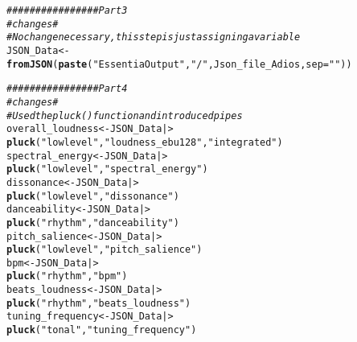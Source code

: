 \documentclass{article}\usepackage[]{graphicx}\usepackage[]{xcolor}
\makeatletter
\newcommand{\hlsng}[1]{\textcolor[rgb]{0.192,0.494,0.8}{#1}}%
\newcommand{\hlcom}[1]{\textcolor[rgb]{0.678,0.584,0.686}{\textit{#1}}}%
\newcommand{\hldef}[1]{\textcolor[rgb]{0.345,0.345,0.345}{#1}}%
\newcommand{\hlkwb}[1]{\textcolor[rgb]{0.69,0.353,0.396}{#1}}%
\newcommand{\hlkwc}[1]{\textcolor[rgb]{0.333,0.667,0.333}{#1}}%
\newcommand{\hlkwd}[1]{\textcolor[rgb]{0.737,0.353,0.396}{\textbf{#1}}}%
\newenvironment{kframe}{%
 \def\at@end@of@kframe{}%
 \ifinner\ifhmode%
  \def\at@end@of@kframe{\end{minipage}}%
  \begin{minipage}{\columnwidth}%
 \fi\fi%
 \def\FrameCommand##1{\hskip\@totalleftmargin \hskip-\fboxsep
 \colorbox{shadecolor}{##1}\hskip-\fboxsep
     \hskip-\linewidth \hskip-\@totalleftmargin \hskip\columnwidth}%
 \MakeFramed {\advance\hsize-\width
   \@totalleftmargin\z@ \linewidth\hsize
   \@setminipage}}%
 {\par\unskip\endMakeFramed%
 \at@end@of@kframe}
\newenvironment{knitrout}{}{} %
\makeatother
\begin{document}
\begin{enumerate}
\begin{knitrout}
\begin{kframe}
\begin{alltt}
\hlcom{################ Part 3}
\hlcom{#changes#}
\hlcom{#No change necessary, this step is just assigning a variable }
\hldef{JSON_Data} \hlkwb{<-} \hlkwd{fromJSON}\hldef{(}\hlkwd{paste}\hldef{(}\hlsng{"EssentiaOutput"}\hldef{,}\hlsng{"/"}\hldef{, Json_file_Adios,} \hlkwc{sep} \hldef{=}\hlsng{""}\hldef{))}

\hlcom{################ Part 4}
\hlcom{#changes#}
\hlcom{#Used the pluck() function and introduced pipes}
\hldef{overall_loudness}  \hlkwb{<-} \hldef{JSON_Data |>}
  \hlkwd{pluck}\hldef{(}\hlsng{"lowlevel"}\hldef{,} \hlsng{"loudness_ebu128"}\hldef{,} \hlsng{"integrated"}\hldef{)}
\hldef{spectral_energy}   \hlkwb{<-} \hldef{JSON_Data |>}
  \hlkwd{pluck}\hldef{(}\hlsng{"lowlevel"}\hldef{,} \hlsng{"spectral_energy"}\hldef{)}
\hldef{dissonance}        \hlkwb{<-} \hldef{JSON_Data |>}
  \hlkwd{pluck}\hldef{(}\hlsng{"lowlevel"}\hldef{,} \hlsng{"dissonance"}\hldef{)}
\hldef{danceability}      \hlkwb{<-} \hldef{JSON_Data |>}
  \hlkwd{pluck}\hldef{(}\hlsng{"rhythm"}\hldef{,} \hlsng{"danceability"}\hldef{)}
\hldef{pitch_salience}    \hlkwb{<-} \hldef{JSON_Data |>}
  \hlkwd{pluck}\hldef{(}\hlsng{"lowlevel"}\hldef{,} \hlsng{"pitch_salience"}\hldef{)}
\hldef{bpm}               \hlkwb{<-} \hldef{JSON_Data |>}
  \hlkwd{pluck}\hldef{(}\hlsng{"rhythm"}\hldef{,} \hlsng{"bpm"}\hldef{)}
\hldef{beats_loudness}    \hlkwb{<-} \hldef{JSON_Data |>}
  \hlkwd{pluck}\hldef{(}\hlsng{"rhythm"}\hldef{,} \hlsng{"beats_loudness"}\hldef{)}
\hldef{tuning_frequency}  \hlkwb{<-} \hldef{JSON_Data |>}
  \hlkwd{pluck}\hldef{(}\hlsng{"tonal"}\hldef{,} \hlsng{"tuning_frequency"}\hldef{)}


\end{alltt}
\end{kframe}
\end{knitrout}
\end{enumerate}
\end{document}

